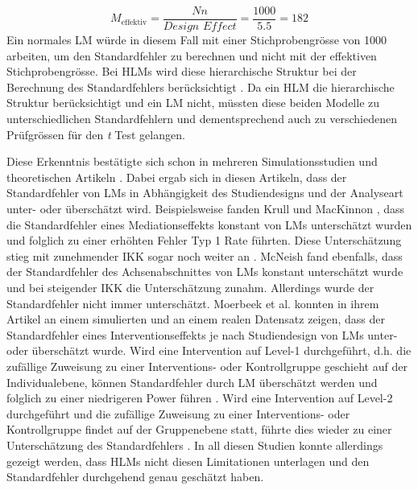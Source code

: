 \documentclass[12pt]{article}\usepackage[]{graphicx}\usepackage[]{color}
\begin{document}
\begin{equation}
M_{\text{effektiv}} = \frac{Nn}{\textit{Design Effect}} = \frac{1000}{5.5} = 182
\end{equation}
Ein normales LM würde in diesem Fall mit einer Stichprobengrösse von 1000 arbeiten, um den Standardfehler zu berechnen und nicht mit der effektiven Stichprobengrösse. Bei HLMs wird diese hierarchische Struktur bei der Berechnung des Standardfehlers berücksichtigt \citep{snijdersbosker1993SEcalc}. Da ein HLM die hierarchische Struktur berücksichtigt und ein LM nicht, müssten diese beiden Modelle zu unterschiedlichen Standardfehlern und dementsprechend auch zu verschiedenen Prüfgrössen für den \textit{t} Test gelangen. 

Diese Erkenntnis bestätigte sich schon in mehreren Simulationsstudien und theoretischen Artikeln \citep[z.B.][]{guo2005groupeddatahlm, krullmackinnon2010mediation, mcneish2014analyzing, MOERBEEK2003341}. Dabei ergab sich in diesen Artikeln, dass der Standardfehler von LMs in Abhängigkeit des Studiendesigns und der Analyseart unter- oder überschätzt wird. Beispielsweise fanden Krull und MacKinnon \citeyearpar{krullmackinnon2010mediation}, dass die Standardfehler eines Mediationseffekts konstant von LMs unterschätzt wurden und folglich zu einer erhöhten Fehler Typ 1 Rate führten. Diese Unterschätzung stieg mit zunehmender IKK sogar noch weiter an \citep{krullmackinnon2010mediation}. McNeish \citeyearpar{mcneish2014analyzing} fand ebenfalls, dass der Standardfehler des Achsenabschnittes von LMs konstant unterschätzt wurde und bei steigender IKK die Unterschätzung zunahm. Allerdings wurde der Standardfehler nicht immer unterschätzt. Moerbeek et al. \citeyearpar{MOERBEEK2003341} konnten in ihrem Artikel an einem simulierten und an einem realen Datensatz zeigen, dass der Standardfehler eines Interventionseffekts je nach Studiendesign von LMs unter- oder überschätzt wurde. Wird eine Intervention auf Level-1 durchgeführt, d.h. die zufällige Zuweisung zu einer Interventions- oder Kontrollgruppe geschieht auf der Individualebene, können Standardfehler durch LM überschätzt werden und folglich zu einer niedrigeren Power führen \citep{MOERBEEK2003341}. Wird eine Intervention auf Level-2 durchgeführt und die zufällige Zuweisung zu einer Interventions- oder Kontrollgruppe findet auf der Gruppenebene statt, führte dies wieder zu einer Unterschätzung des Standardfehlers \citep{MOERBEEK2003341}. In all diesen Studien konnte allerdings gezeigt werden, dass HLMs nicht diesen Limitationen unterlagen und den Standardfehler durchgehend genau geschätzt haben.
\end{document}
